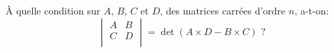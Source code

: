 \begin{exercice} 
À quelle condition sur $A$, $B$, $C$ et $D$, des matrices carrées d'ordre $n$, a-t-on:
    $$
        \begin{vmatrix}
            A & B\\
            C & D\\
        \end{vmatrix} = \det(A \times D - B \times C) \text{ ?}
    $$ 
\end{exercice}